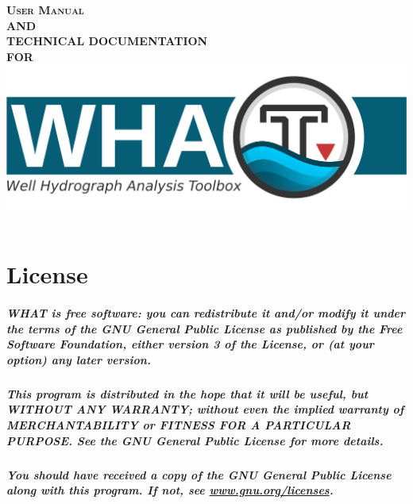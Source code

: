 \documentclass[10pt, letterpaper, fleqn]{report}
\begin{document}
\begin{titlepage}
\begin{center}

\textbf{\textsc{\fontsize{30}{36}\selectfont User Manual}}\\[1.0cm]
\textbf{\textsc{\fontsize{30}{36}\selectfont AND}}\\[1.0cm]
\textbf{\textsc{\fontsize{30}{36}\selectfont TECHNICAL DOCUMENTATION}}\\[1.0cm]
\textbf{\textsc{\fontsize{30}{36}\selectfont FOR}}\\

\includegraphics[width=1\textwidth]{WHAT_banner}~\\[1cm]

\end{center}
\end{titlepage}


\chapter*{License}

\paragraph{WHAT is free software: you can redistribute it and/or modify it under the terms of the GNU General Public License as published by the Free Software Foundation, either version 3 of the License, or (at your option) any later version.}
\paragraph{This program is distributed in the hope that it will be useful, but WITHOUT ANY WARRANTY; without even the implied warranty of MERCHANTABILITY or FITNESS FOR A PARTICULAR PURPOSE. See the GNU General Public License for more details.}
\paragraph{You should have received a copy of the GNU General Public License along with this program. If not, see \url{www.gnu.org/licenses}.}
\end{document}
